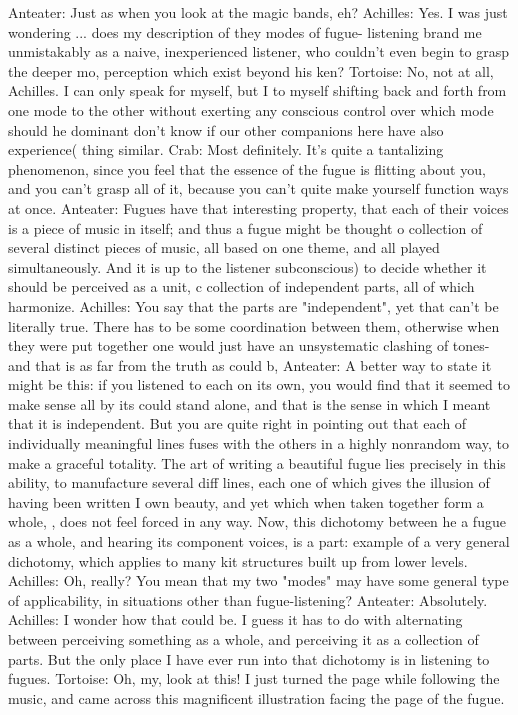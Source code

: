 Anteater: Just as when you look at the magic bands, eh?
Achilles: Yes. I was just wondering ... does my description of they modes of fugue-
   listening brand me unmistakably as a naive, inexperienced listener, who couldn't even
   begin to grasp the deeper mo, perception which exist beyond his ken?
Tortoise: No, not at all, Achilles. I can only speak for myself, but I to myself shifting
   back and forth from one mode to the other without exerting any conscious control
   over which mode should he dominant don't know if our other companions here have
   also experience( thing similar.
Crab: Most definitely. It's quite a tantalizing phenomenon, since you feel that the essence
   of the fugue is flitting about you, and you can't grasp all of it, because you can't quite
   make yourself function ways at once.
Anteater: Fugues have that interesting property, that each of their voices is a piece of
   music in itself; and thus a fugue might be thought o collection of several distinct
   pieces of music, all based on one theme, and all played simultaneously. And it is up to
   the listener subconscious) to decide whether it should be perceived as a unit, c
   collection of independent parts, all of which harmonize.
Achilles: You say that the parts are "independent", yet that can't be literally true. There
   has to be some coordination between them, otherwise when they were put together
   one would just have an unsystematic clashing of tones-and that is as far from the truth
   as could b,
Anteater: A better way to state it might be this: if you listened to each on its own, you
   would find that it seemed to make sense all by its could stand alone, and that is the
   sense in which I meant that it is independent. But you are quite right in pointing out
   that each of individually meaningful lines fuses with the others in a highly nonrandom
   way, to make a graceful totality. The art of writing a beautiful fugue lies precisely in
   this ability, to manufacture several diff lines, each one of which gives the illusion of
   having been written I own beauty, and yet which when taken together form a whole, ,
   does not feel forced in any way. Now, this dichotomy between he a fugue as a whole,
   and hearing its component voices, is a part: example of a very general dichotomy,
   which applies to many kit structures built up from lower levels.
Achilles: Oh, really? You mean that my two "modes" may have some general type of
   applicability, in situations other than fugue-listening?
Anteater: Absolutely.
Achilles: I wonder how that could be. I guess it has to do with alternating between
   perceiving something as a whole, and perceiving it as a collection of parts. But the
   only place I have ever run into that dichotomy is in listening to fugues.
Tortoise: Oh, my, look at this! I just turned the page while following the music, and came
   across this magnificent illustration facing the page of the fugue.




